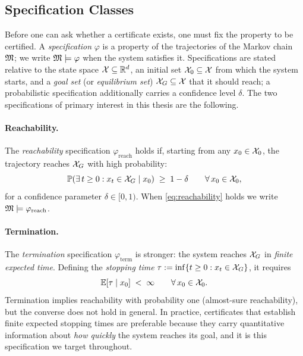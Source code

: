 \subsection{Specification Classes}
\label{subsec:specs}

Before one can ask whether a certificate exists, one must fix the property to be
certified. A \emph{specification} $\varphi$ is a property of the trajectories of
the Markov chain $\mathfrak{M}$; we write $\mathfrak{M} \models \varphi$ when the system satisfies
it. Specifications are stated relative to the state space $\mathcal{X} \subseteq \mathbb{R}^d$,
an initial set $\mathcal{X}_0 \subseteq \mathcal{X}$ from which the system starts, and a
\textit{goal set} (or \textit{equilibrium set}) $\mathcal{X}_G \subseteq \mathcal{X}$ that it
should reach; a probabilistic specification additionally carries a confidence
level $\delta$. The two specifications of primary interest in this thesis are the
following.

\paragraph{Reachability.} The \textit{reachability} specification
$\varphi_{\mathrm{reach}}$ holds if, starting from any $x_0 \in \mathcal{X}_0$, the
trajectory reaches $\mathcal{X}_G$ with high probability:
%
\begin{equation}
    \mathbb{P}\!\left(\exists\, t \geq 0 : x_t \in \mathcal{X}_G \;\middle|\; x_0\right)
    \;\geq\; 1 - \delta
    \qquad \forall\, x_0 \in \mathcal{X}_0,
    \label{eq:reachability}
\end{equation}
%
for a confidence parameter $\delta \in [0,1)$. When \eqref{eq:reachability} holds
we write $\mathfrak{M} \models \varphi_{\mathrm{reach}}$.

\paragraph{Termination.} The \textit{termination} specification
$\varphi_{\mathrm{term}}$ is stronger: the system reaches $\mathcal{X}_G$ in
\textit{finite expected time}. Defining the \textit{stopping time}
$\tau := \inf\{t \geq 0 : x_t \in \mathcal{X}_G\}$, it requires
%
\begin{equation}
    \mathbb{E}[\tau \mid x_0] \;<\; \infty
    \qquad \forall\, x_0 \in \mathcal{X}_0.
    \label{eq:termination}
\end{equation}
%
Termination implies reachability with probability one (almost-sure
reachability), but the converse does not hold in general. In practice,
certificates that establish finite expected stopping times are preferable
because they carry quantitative information about \textit{how quickly} the system
reaches its goal, and it is this specification we target throughout.

